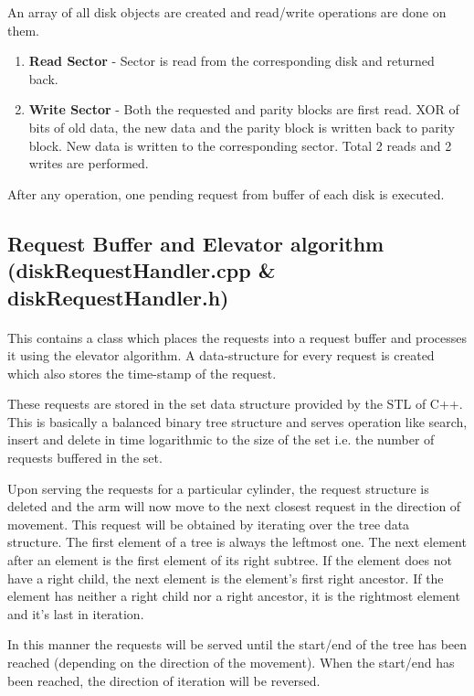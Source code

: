 \documentclass[11pt]{article}
\begin{document}
An array of all disk objects are created and read/write operations are done on them.
\begin{enumerate}
\item \textbf{Read Sector} -  Sector is read from the corresponding disk and returned back.
\item \textbf{Write Sector} - Both the requested and parity blocks are first read. XOR of bits of old data, the new data and the parity block is written back to parity block. New data is written to the corresponding sector. Total 2 reads and 2 writes are performed.
\end{enumerate}

After any operation, one pending request from buffer of each disk is executed.

\subsection{Request Buffer and Elevator algorithm \\ (diskRequestHandler.cpp \& diskRequestHandler.h)}
\paragraph{}

This contains a class which places the requests into a request buffer and processes it using the elevator algorithm. A data-structure for every request is created which also stores the time-stamp of the request.

These requests are stored in the set data structure provided by the STL of C++. This is basically a balanced binary tree structure and serves operation like search, insert and delete in time logarithmic to the size of the set i.e. the number of requests buffered in the set.

Upon serving the requests for a particular cylinder, the request structure is deleted and the arm will now move to the next closest request in the direction of movement. This request will be obtained by iterating over the tree data structure. The first element of a tree is always the leftmost one. The next element after an element is the first element of its right subtree. If the element does not have a right child, the next element is the element's first right ancestor. If the element has neither a right child nor a right ancestor, it is the rightmost element and it's last in iteration. 

In this manner the requests will be served until the start/end of the tree has been reached (depending on the direction of the movement). When the start/end has been reached, the direction of iteration will be reversed.
\end{document}
